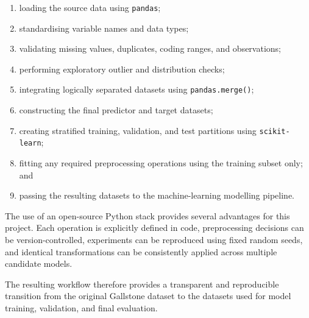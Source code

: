 \begin{enumerate}
    \item loading the source data using \texttt{pandas};
    \item standardising variable names and data types;
    \item validating missing values, duplicates, coding ranges, and
          observations;
    \item performing exploratory outlier and distribution checks;
    \item integrating logically separated datasets using
          \texttt{pandas.merge()};
    \item constructing the final predictor and target datasets;
    \item creating stratified training, validation, and test partitions using
          \texttt{scikit-learn};
    \item fitting any required preprocessing operations using the training
          subset only; and
    \item passing the resulting datasets to the machine-learning modelling
          pipeline.
\end{enumerate}

The use of an open-source Python stack provides several advantages for this
project. Each operation is explicitly defined in code, preprocessing decisions
can be version-controlled, experiments can be reproduced using fixed random
seeds, and identical transformations can be consistently applied across
multiple candidate models.

The resulting workflow therefore provides a transparent and reproducible
transition from the original Gallstone dataset to the datasets used for model
training, validation, and final evaluation.
